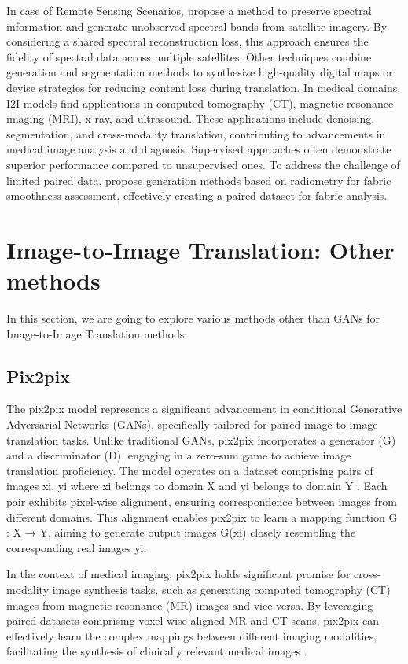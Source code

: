 \documentclass[UKenglish,12pt]{master-style}
\begin{document}
In case of Remote Sensing Scenarios, \cite{application} propose a method to preserve spectral information and generate unobserved spectral bands from satellite imagery. By considering a shared spectral reconstruction loss, this approach ensures the fidelity of spectral data across multiple satellites. Other techniques combine generation and segmentation methods to synthesize high-quality digital maps or devise strategies for reducing content loss during translation. In medical domains, I2I models find applications in computed tomography (CT), magnetic resonance imaging (MRI), x-ray, and ultrasound. These applications include denoising, segmentation, and cross-modality translation, contributing to advancements in medical image analysis and diagnosis. Supervised approaches often demonstrate superior performance compared to unsupervised ones. To address the challenge of limited paired data,\cite{application} propose generation methods based on radiometry for fabric smoothness assessment, effectively creating a paired dataset for fabric analysis.

\section{Image-to-Image Translation: Other methods}

In this section, we are going to explore various methods other than GANs for Image-to-Image Translation methods: 

\subsection*{Pix2pix}

The pix2pix model represents a significant advancement in conditional Generative Adversarial Networks (GANs), specifically tailored for paired image-to-image translation tasks. Unlike traditional GANs, pix2pix incorporates a generator (G) and a discriminator (D), engaging in a zero-sum game to achieve image translation proficiency. The model operates on a dataset comprising pairs of images {xi, yi} where xi belongs to domain X and yi belongs to domain Y \cite{pix2pix} . Each pair exhibits pixel-wise alignment, ensuring correspondence between images from different domains. This alignment enables pix2pix to learn a mapping function G : X → Y, aiming to generate output images G(xi) closely resembling the corresponding real images yi.

In the context of medical imaging, pix2pix holds significant promise for cross-modality image synthesis tasks, such as generating computed tomography (CT) images from magnetic resonance (MR) images and vice versa. By leveraging paired datasets comprising voxel-wise aligned MR and CT scans, pix2pix can effectively learn the complex mappings between different imaging modalities, facilitating the synthesis of clinically relevant medical images \cite{pix2pix} .
\end{document}
